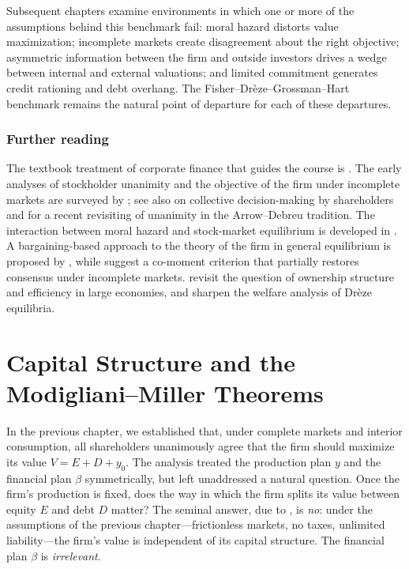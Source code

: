 \documentclass[11pt,a4paper,oneside]{book}
\theoremstyle{plain}
\theoremstyle{definition}
\theoremstyle{remark}
\numberwithin{equation}{chapter}
\begin{document}
Subsequent chapters examine environments in which one or more of the assumptions behind this benchmark fail: moral hazard distorts value maximization; incomplete markets create disagreement about the right objective; asymmetric information between the firm and outside investors drives a wedge between internal and external valuations; and limited commitment generates credit rationing and debt overhang.
The Fisher--Drèze--Grossman--Hart benchmark remains the natural point of departure for each of these departures.

\subsection{Further reading}

The textbook treatment of corporate finance that guides the course is \citet{Tirole2006}.
The early analyses of stockholder unanimity and the objective of the firm under incomplete markets are surveyed by \citet{KelseyMilne1996}; see also \citet{TvedeCres2005} on collective decision-making by shareholders and \citet{CarcelesCoenPirani2009} for a recent revisiting of unanimity in the Arrow--Debreu tradition.
The interaction between moral hazard and stock-market equilibrium is developed in \citet{MagillQuinzii2008}.
A bargaining-based approach to the theory of the firm in general equilibrium is proposed by \citet{BritzHeringsPredtetchinski2013}, while \citet{MagillQuinzii2010} suggest a co-moment criterion that partially restores consensus under incomplete markets.
\citet{BejanBidian2011} revisit the question of ownership structure and efficiency in large economies, and \citet{DierkerDierker2011} sharpen the welfare analysis of Drèze equilibria.

\chapter{Capital Structure and the Modigliani--Miller Theorems}
\label{ch:capital-structure}

In the previous chapter, we established that, under complete markets and interior consumption, all shareholders unanimously agree that the firm should maximize its value $V = E + D + y_0$.
The analysis treated the production plan $y$ and the financial plan $\beta$ symmetrically, but left unaddressed a natural question.
Once the firm's production is fixed, does the way in which the firm splits its value between equity $E$ and debt $D$ matter?
The seminal answer, due to \citet{ModiglianiMiller1958}, is \emph{no}: under the assumptions of the previous chapter---frictionless markets, no taxes, unlimited liability---the firm's value is independent of its capital structure.
The financial plan $\beta$ is \emph{irrelevant}.
\end{document}
